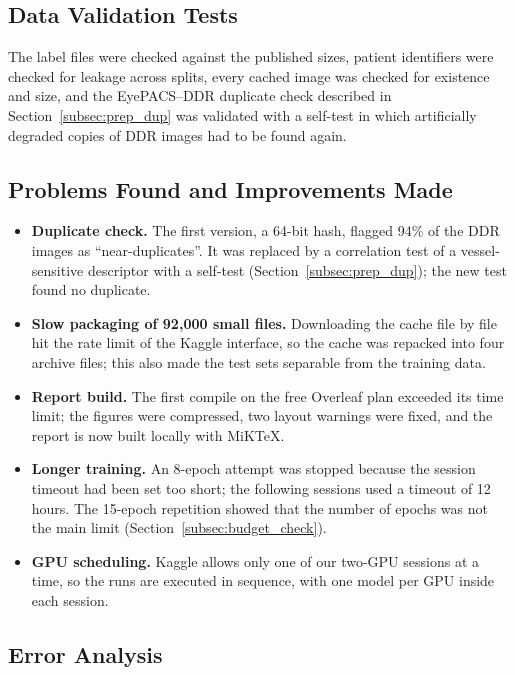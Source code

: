 \subsection{Data Validation Tests}
\label{subsec:data_tests}

The label files were checked against the published sizes, patient identifiers were checked for leakage across splits, every cached image was checked for existence and size, and the EyePACS--DDR duplicate check described in Section~\ref{subsec:prep_dup} was validated with a self-test in which artificially degraded copies of DDR images had to be found again.

\subsection{Problems Found and Improvements Made}
\label{subsec:improvements}

\begin{itemize}[leftmargin=1.5em]
    \item \textbf{Duplicate check.} The first version, a 64-bit hash, flagged 94\% of the DDR images as ``near-duplicates''. It was replaced by a correlation test of a vessel-sensitive descriptor with a self-test (Section~\ref{subsec:prep_dup}); the new test found no duplicate.
    \item \textbf{Slow packaging of 92{,}000 small files.} Downloading the cache file by file hit the rate limit of the Kaggle interface, so the cache was repacked into four archive files; this also made the test sets separable from the training data.
    \item \textbf{Report build.} The first compile on the free Overleaf plan exceeded its time limit; the figures were compressed, two layout warnings were fixed, and the report is now built locally with MiKTeX.
    \item \textbf{Longer training.} An 8-epoch attempt was stopped because the session timeout had been set too short; the following sessions used a timeout of 12 hours. The 15-epoch repetition showed that the number of epochs was not the main limit (Section~\ref{subsec:budget_check}).
    \item \textbf{GPU scheduling.} Kaggle allows only one of our two-GPU sessions at a time, so the runs are executed in sequence, with one model per GPU inside each session.
\end{itemize}

\subsection{Error Analysis}
\label{subsec:error_analysis}

